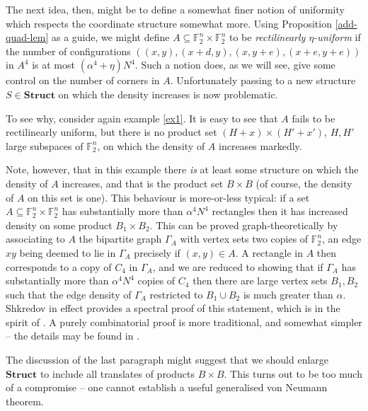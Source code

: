 \documentclass[12pt,a4paper,reqno]{amsart}
\numberwithin{equation}{section}
\theoremstyle{plain}
\theoremstyle{definition}
\begin{document}
\noindent The next idea, then, might be to 
define a somewhat finer notion of uniformity which respects the coordinate structure somewhat more. Using Proposition \ref{add-quad-lem} as a guide, we might define $A \subseteq \mathbb{F}_2^n \times \mathbb{F}_2^n$ to be \textit{rectilinearly $\eta$-uniform} if the number of configurations $((x,y),(x+d,y),(x,y+e),(x+e,y+e))$ in $A^4$ is at most $(\alpha^4 + \eta) N^4$. Such a notion does, as we will see, give some control on the number of corners in $A$. Unfortunately passing to a new structure $S \in \mathbf{Struct}$ on which the density increases is now problematic.\vspace{11pt}

\noindent To see why, consider again example \eqref{ex1}. It is easy to see that $A$ fails to be rectilinearly uniform, but there is no product set $(H + x) \times (H' + x')$, $H, H'$ large subspaces of $\mathbb{F}_2^n$, on which the density of $A$ increases markedly. \vspace{11pt}

\noindent Note, however, that in this example there \textit{is} at least some structure on which the density of $A$ increases, and that is the product set $B \times B$ (of course, the density of $A$ on this set is one). This behaviour is more-or-less typical: if a set $A \subseteq \mathbb{F}_2^n \times \mathbb{F}_2^n$ has substantially more than $\alpha^4 N^4$ rectangles then it has increased density on some product $B_1 \times B_2$. This can be proved graph-theoretically by associating to $A$ the bipartite graph $\Gamma_A$ with vertex sets two copies of $\mathbb{F}_2^n$, an edge $xy$ being deemed to lie in $\Gamma_A$ precisely if $(x,y) \in A$. A rectangle in $A$ then corresponds to a copy of $C_4$ in $\Gamma_A$, and we are reduced to showing that if $\Gamma_A$ has substantially more than $\alpha^4 N^4$ copies of $C_4$ then there are large vertex sets $B_1,B_2$ such that the edge density of $\Gamma_A$ restricted to $B_1 \cup B_2$ is much greater than $\alpha$. Shkredov in effect provides a spectral proof of this statement, which is in the spirit of \cite{frieze-kannan}. A purely combinatorial proof is more traditional, and somewhat simpler -- the details may be found in \cite{sup-doc-1}.\vspace{11pt}

\noindent The discussion of the last paragraph might suggest that we should enlarge $\mathbf{Struct}$ to include all translates of products $B \times B$. This turns out to be too much of a compromise -- one cannot establish a useful generalised von Neumann theorem. \vspace{11pt}
\end{document}
